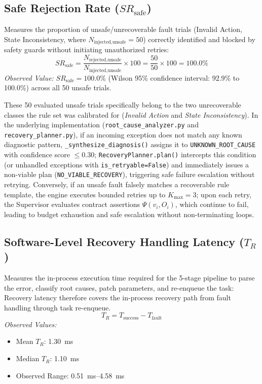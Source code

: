 \documentclass[conference]{IEEEtran}
\begin{document}
\subsection{Safe Rejection Rate ($SR_{\text{safe}}$)}
Measures the proportion of unsafe/unrecoverable fault trials (Invalid Action, State Inconsistency, where $N_{\text{injected,unsafe}} = 50$) correctly identified and blocked by safety guards without initiating unauthorized retries:
\begin{equation}
SR_{\text{safe}} = \frac{N_{\text{rejected,unsafe}}}{N_{\text{injected,unsafe}}} \times 100 = \frac{50}{50} \times 100 = 100.0\%
\end{equation}
\textit{Observed Value:} $SR_{\text{safe}} = 100.0\%$ (Wilson 95\% confidence interval: 92.9\% to 100.0\%) across all 50 unsafe trials.

These 50 evaluated unsafe trials specifically belong to the two unrecoverable classes the rule set was calibrated for (\textit{Invalid Action} and \textit{State Inconsistency}). In the underlying implementation (\texttt{root\_cause\_analyzer.py} and \texttt{recovery\_planner.py}), if an incoming exception does not match any known diagnostic pattern, \texttt{\_synthesize\_diagnosis()} assigns it to \texttt{UNKNOWN\_ROOT\_CAUSE} with confidence score $\le 0.30$; \texttt{RecoveryPlanner.plan()} intercepts this condition (or unhandled exceptions with \texttt{is\_retryable=False}) and immediately issues a non-viable plan (\texttt{NO\_VIABLE\_RECOVERY}), triggering safe failure escalation without retrying. Conversely, if an unsafe fault falsely matches a recoverable rule template, the engine executes bounded retries up to $K_{\text{max}} = 3$; upon each retry, the Supervisor evaluates contract assertions $\Psi(v_i, O_i)$, which continue to fail, leading to budget exhaustion and safe escalation without non-terminating loops.

\subsection{Software-Level Recovery Handling Latency ($T_R$)}
Measures the in-process execution time required for the 5-stage pipeline to parse the error, classify root causes, patch parameters, and re-enqueue the task: Recovery latency therefore covers the in-process recovery path from fault handling through task re-enqueue.
\begin{equation}
T_R = T_{\text{success}} - T_{\text{fault}}
\end{equation}
\textit{Observed Values:}
\begin{itemize}
    \item Mean $T_R$: 1.30~ms
    \item Median $T_R$: 1.10~ms
    \item Observed Range: 0.51~ms--4.58~ms
\end{itemize}
\end{document}
